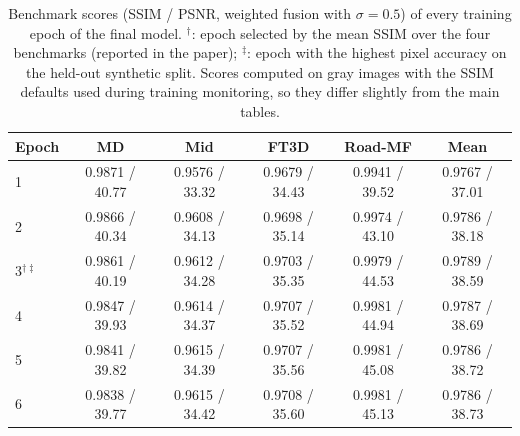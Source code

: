 \begin{table}[htbp]
\centering
\caption{Benchmark scores (SSIM / PSNR, weighted fusion with $\sigma=0.5$) of every training epoch of the final model. $^\dagger$: epoch selected by the mean SSIM over the four benchmarks (reported in the paper); $^\ddagger$: epoch with the highest pixel accuracy on the held-out synthetic split. Scores computed on gray images with the SSIM defaults used during training monitoring, so they differ slightly from the main tables.}
\label{tab:epochs}
\scriptsize
\begin{tabular}{lccccc}
\toprule
Epoch & MD & Mid & FT3D & Road-MF & Mean \\
\midrule
1 & 0.9871 / 40.77 & 0.9576 / 33.32 & 0.9679 / 34.43 & 0.9941 / 39.52 & 0.9767 / 37.01 \\
2 & 0.9866 / 40.34 & 0.9608 / 34.13 & 0.9698 / 35.14 & 0.9974 / 43.10 & 0.9786 / 38.18 \\
3$^{\dagger\ddagger}$ & 0.9861 / 40.19 & 0.9612 / 34.28 & 0.9703 / 35.35 & 0.9979 / 44.53 & 0.9789 / 38.59 \\
4 & 0.9847 / 39.93 & 0.9614 / 34.37 & 0.9707 / 35.52 & 0.9981 / 44.94 & 0.9787 / 38.69 \\
5 & 0.9841 / 39.82 & 0.9615 / 34.39 & 0.9707 / 35.56 & 0.9981 / 45.08 & 0.9786 / 38.72 \\
6 & 0.9838 / 39.77 & 0.9615 / 34.42 & 0.9708 / 35.60 & 0.9981 / 45.13 & 0.9786 / 38.73 \\
\bottomrule
\end{tabular}
\end{table}
